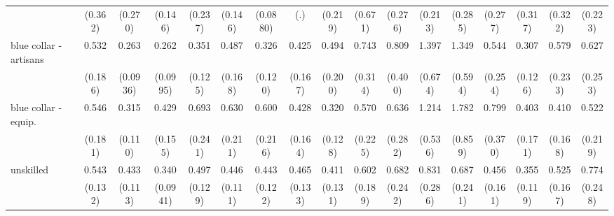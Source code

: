 {\begin{tabular}{l*{16}{c}}
                    &     (0.362)         &     (0.270)         &     (0.146)         &     (0.237)         &     (0.146)         &    (0.0880)         &         (.)         &     (0.219)         &     (0.671)         &     (0.276)         &     (0.213)         &     (0.285)         &     (0.277)         &     (0.317)         &     (0.322)         &     (0.223)         \\
[1em]
blue collar - artisans&       0.532         &       0.263\sym{***}&       0.262\sym{***}&       0.351\sym{**} &       0.487\sym{*}  &       0.326\sym{**} &       0.425\sym{*}  &       0.494         &       0.743         &       0.809         &       1.397         &       1.349         &       0.544         &       0.307\sym{**} &       0.579         &       0.627         \\
                    &     (0.186)         &    (0.0936)         &    (0.0995)         &     (0.125)         &     (0.168)         &     (0.120)         &     (0.167)         &     (0.200)         &     (0.314)         &     (0.400)         &     (0.674)         &     (0.594)         &     (0.254)         &     (0.126)         &     (0.233)         &     (0.253)         \\
[1em]
blue collar - equip.&       0.546         &       0.315\sym{***}&       0.429\sym{*}  &       0.693         &       0.630         &       0.600         &       0.428\sym{*}  &       0.320\sym{**} &       0.570         &       0.636         &       1.214         &       1.782         &       0.799         &       0.403\sym{*}  &       0.410\sym{*}  &       0.522         \\
                    &     (0.181)         &     (0.110)         &     (0.155)         &     (0.241)         &     (0.211)         &     (0.216)         &     (0.164)         &     (0.128)         &     (0.225)         &     (0.282)         &     (0.536)         &     (0.859)         &     (0.370)         &     (0.171)         &     (0.168)         &     (0.219)         \\
[1em]
unskilled           &       0.543\sym{*}  &       0.433\sym{**} &       0.340\sym{***}&       0.497\sym{**} &       0.446\sym{**} &       0.443\sym{**} &       0.465\sym{**} &       0.411\sym{**} &       0.602         &       0.682         &       0.831         &       0.687         &       0.456\sym{*}  &       0.355\sym{**} &       0.525\sym{*}  &       0.774         \\
                    &     (0.132)         &     (0.113)         &    (0.0941)         &     (0.129)         &     (0.111)         &     (0.122)         &     (0.133)         &     (0.131)         &     (0.189)         &     (0.242)         &     (0.286)         &     (0.241)         &     (0.161)         &     (0.119)         &     (0.167)         &     (0.248)         \\

\end{tabular}}
